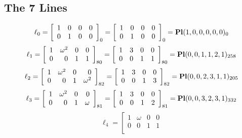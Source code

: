 \documentclass{article}
\begin{document}
{\subsection*{The 7 Lines}
$$
\ell_{0} = 
\left[
\begin{array}{*{4}{r}}
1 & 0 & 0 & 0\\
0 & 1 & 0 & 0\\
\end{array}
\right]
_{0}
=
\left[
\begin{array}{*{4}c}
1  & 0  & 0  & 0\\
0  & 1  & 0  & 0\\
\end{array}
\right]_{0}
={\rm\bf Pl}(1,0,0,0,0,0 )_{0}$$
$$
\ell_{1} = 
\left[
\begin{array}{*{4}{r}}
1 & \omega^{2} & 0 & 0\\
0 & 0 & 1 & 1\\
\end{array}
\right]
_{80}
=
\left[
\begin{array}{*{4}c}
1  & 3  & 0  & 0\\
0  & 0  & 1  & 1\\
\end{array}
\right]_{80}
={\rm\bf Pl}(0,0,1,1,2,1 )_{258}$$
$$
\ell_{2} = 
\left[
\begin{array}{*{4}{r}}
1 & \omega^{2} & 0 & 0\\
0 & 0 & 1 & \omega^{2}\\
\end{array}
\right]
_{82}
=
\left[
\begin{array}{*{4}c}
1  & 3  & 0  & 0\\
0  & 0  & 1  & 3\\
\end{array}
\right]_{82}
={\rm\bf Pl}(0,0,2,3,1,1 )_{205}$$
$$
\ell_{3} = 
\left[
\begin{array}{*{4}{r}}
1 & \omega^{2} & 0 & 0\\
0 & 0 & 1 & \omega \\
\end{array}
\right]
_{81}
=
\left[
\begin{array}{*{4}c}
1  & 3  & 0  & 0\\
0  & 0  & 1  & 2\\
\end{array}
\right]_{81}
={\rm\bf Pl}(0,0,3,2,3,1 )_{332}$$
$$
\ell_{4} = 
\left[
\begin{array}{*{4}{r}}
1 & \omega  & 0 & 0\\
0 & 0 & 1 & 1\\

\end{array}$$}
\end{document}
